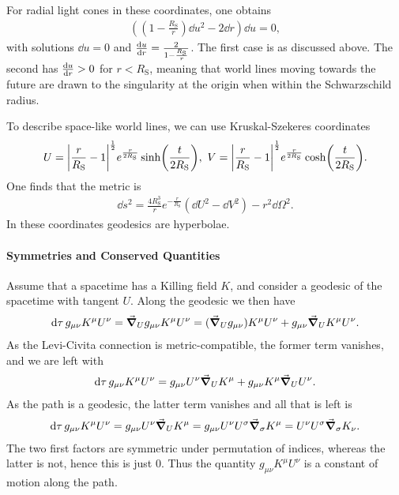 For radial light cones in these coordinates, one obtains
\begin{align*}
	\left(\left(1 - \frac{R_{\text{S}}}{r}\right)\dd{u}^{2} - 2\dd{r}\right)\dd{u} = 0,
\end{align*}
with solutions $\dd{u} = 0$ and $\dv{u}{r} = \frac{2}{1 - \frac{R_{\text{S}}}{r}}$. The first case is as discussed above. The second has $\dv{u}{r} > 0$ for $r < R_{\text{S}}$, meaning that world lines moving towards the future are drawn to the singularity at the origin when within the Schwarzschild radius.

To describe space-like world lines, we can use Kruskal-Szekeres coordinates
\begin{align*}
	U = \abs{\frac{r}{R_{\text{S}}} - 1}^{\frac{1}{2}}e^{\frac{r}{2R_{\text{S}}}}\sinh(\frac{t}{2R_{\text{S}}}),\ V = \abs{\frac{r}{R_{\text{S}}} - 1}^{\frac{1}{2}}e^{\frac{r}{2R_{\text{S}}}}\cosh(\frac{t}{2R_{\text{S}}}).
\end{align*}
One finds that the metric is
\begin{align*}
	\dd{s}^{2} = \frac{4R_{\text{S}}^{3}}{r}e^{-\frac{r}{R_{\text{S}}}}(\dd{U}^{2} - \dd{V}^{2}) - r^{2}\dd{\Omega}^{2}.
\end{align*}
In these coordinates geodesics are hyperbolae.

\paragraph{Symmetries and Conserved Quantities}
Assume that a spacetime has a Killing field $K$, and consider a geodesic of the spacetime with tangent $U$. Along the geodesic we then have
\begin{align*}
	\dd{\tau}g_{\mu\nu}K^{\mu}U^{\nu} = \grad_{U}{g_{\mu\nu}K^{\mu}U^{\nu}} = (\grad_{U}{g_{\mu\nu}})K^{\mu}U^{\nu} + g_{\mu\nu}\grad_{U}{K^{\mu}U^{\nu}}.
\end{align*}
As the Levi-Civita connection is metric-compatible, the former term vanishes, and we are left with
\begin{align*}
	\dd{\tau}g_{\mu\nu}K^{\mu}U^{\nu} = g_{\mu\nu}U^{\nu}\grad_{U}{K^{\mu}} + g_{\mu\nu}K^{\mu}\grad_{U}{U^{\nu}}.
\end{align*}
As the path is a geodesic, the latter term vanishes and all that is left is
\begin{align*}
	\dd{\tau}g_{\mu\nu}K^{\mu}U^{\nu} = g_{\mu\nu}U^{\nu}\grad_{U}{K^{\mu}} = g_{\mu\nu}U^{\nu}U^{\sigma}\grad_{\sigma}{K^{\mu}} = U^{\nu}U^{\sigma}\grad_{\sigma}{K_{\nu}}.
\end{align*}
The two first factors are symmetric under permutation of indices, whereas the latter is not, hence this is just $0$. Thus the quantity $g_{\mu\nu}K^{\mu}U^{\nu}$ is a constant of motion along the path.

